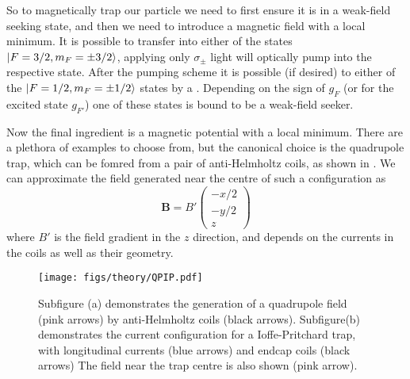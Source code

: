So to magnetically trap our particle we need to first ensure it is in a
weak-field seeking state, and then we need to introduce a magnetic field with a
local minimum. It is possible to transfer into either of the states
$\ket{F=3/2, m_F=\pm3/2}$, applying only $\sigma_\pm$ light will optically pump
into the respective state. After the pumping scheme it is possible (if desired)
to either of the $\ket{F=1/2, m_F=\pm1/2}$ states by a . Depending on the sign of $g_F$ (or for the excited state $g_{F'}$) 
one of these states is bound to be a weak-field seeker.

Now the final ingredient is a magnetic potential with a local minimum. There
are a plethora of examples to choose from, but the canonical choice is the
quadrupole trap, which can be fomred from a pair of anti-Helmholtz coils, as
shown in . We can approximate the field
generated near the centre of such a configuration as~\cite{} %
%
\begin{equation}
  \mathbf{B} = B'\begin{pmatrix} -x/2 \\ -y/2 \\ z \end{pmatrix}
  \label{theory:eqn:quadrupole}
\end{equation}
%
where $B'$ is the field gradient in the $z$ direction, and depends on the
currents in the coils as well as their geometry.

\begin{figure}
  \centering
  \texttt{[image: figs/theory/QPIP.pdf]}
  \caption{Subfigure (a) demonstrates the generation of a quadrupole field
    (pink arrows) by
  anti-Helmholtz coils (black arrows). Subfigure(b) demonstrates the current
  configuration for a
  Ioffe-Pritchard trap, with longitudinal currents (blue arrows) and endcap
coils (black arrows) The field near the trap centre is also shown (pink arrow).
}
  \label{theory:fig:fields}
\end{figure}

